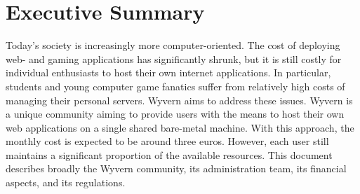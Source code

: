 \section{Executive Summary}
Today's society is increasingly more computer-oriented. The cost of deploying web- and gaming applications has significantly shrunk, but it is still costly for individual enthusiasts to host their own internet applications. In particular, students and young computer game fanatics suffer from relatively high costs of managing their personal servers. Wyvern aims to address these issues. Wyvern is a unique community aiming to provide users with the means to host their own web applications on a single shared bare-metal machine. With this approach, the monthly cost is expected to be around three euros. However, each user still maintains a significant proportion of the available resources. This document describes broadly the Wyvern community, its administration team, its financial aspects, and its regulations.

